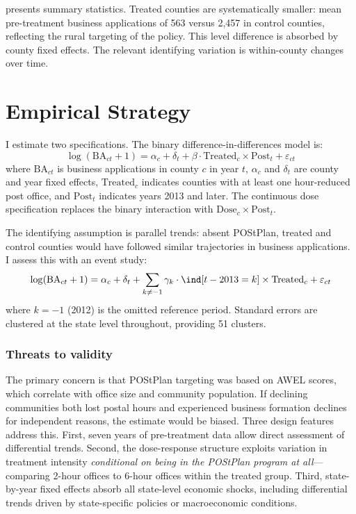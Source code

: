 \documentclass[12pt]{article}
\begin{document}


 presents summary statistics. Treated counties are systematically smaller: mean pre-treatment business applications of 563 versus 2,457 in control counties, reflecting the rural targeting of the policy. This level difference is absorbed by county fixed effects. The relevant identifying variation is within-county changes over time.

\section{Empirical Strategy}

I estimate two specifications. The binary difference-in-differences model is:
\begin{equation}
\log(\text{BA}_{ct} + 1) = \alpha_c + \delta_t + \beta \cdot \text{Treated}_c \times \text{Post}_t + \varepsilon_{ct}
\label{eq:binary}
\end{equation}
where $\text{BA}_{ct}$ is business applications in county $c$ in year $t$, $\alpha_c$ and $\delta_t$ are county and year fixed effects, $\text{Treated}_c$ indicates counties with at least one hour-reduced post office, and $\text{Post}_t$ indicates years 2013 and later. The continuous dose specification replaces the binary interaction with $\text{Dose}_c \times \text{Post}_t$.

The identifying assumption is parallel trends: absent POStPlan, treated and control counties would have followed similar trajectories in business applications. I assess this with an event study:
\begin{equation}
\log(\text{BA}_{ct} + 1) = \alpha_c + \delta_t + \sum_{k \neq -1} \gamma_k \cdot \ind[t - 2013 = k] \times \text{Treated}_c + \varepsilon_{ct}
\label{eq:eventstudy}
\end{equation}
where $k = -1$ (2012) is the omitted reference period. Standard errors are clustered at the state level throughout, providing 51 clusters.

\subsubsection*{Threats to validity} The primary concern is that POStPlan targeting was based on AWEL scores, which correlate with office size and community population. If declining communities both lost postal hours and experienced business formation declines for independent reasons, the estimate would be biased. Three design features address this. First, seven years of pre-treatment data allow direct assessment of differential trends. Second, the dose-response structure exploits variation in treatment intensity \emph{conditional on being in the POStPlan program at all}---comparing 2-hour offices to 6-hour offices within the treated group. Third, state-by-year fixed effects absorb all state-level economic shocks, including differential trends driven by state-specific policies or macroeconomic conditions.
\end{document}
